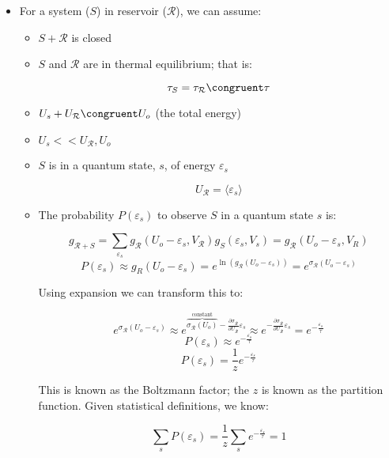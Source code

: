 \begin{itemize}

  \item For a system ($S$) in reservoir ($\mathcal{R}$), we can assume:

    \begin{itemize}

      \item $S+\mathcal{R}$ is closed

      \item $S$ and $\mathcal{R}$ are in thermal equilibrium; that is:

        $$\tau_S=\tau_{\mathcal{R}}\congruent \tau$$

      \item $U_s+U_{\mathcal{R}}\congruent U_o$ (the total energy)

      \item $U_s << U_{\mathcal{R}}, U_o$

      \item $S$ is in a quantum state, $s$, of energy $\varepsilon_s$

        $$U_{\mathcal{R}}=\langle \varepsilon_s\rangle$$

      \item The probability $P(\varepsilon_s)$ to observe $S$ in a quantum state $s$ is:

        $$g_{\mathcal{R}+S}=\sum_{\varepsilon_s}g_{\mathcal{R}}(U_o-\varepsilon_s,V_{\mathcal{R}})g_S(\varepsilon_s,V_s)=g_{\mathcal{R}}(U_o-\varepsilon_s,V_R)$$
        $$P(\varepsilon_s)\approx g_R(U_o-\varepsilon_s)=e^{\ln(g_{\mathcal{R}}(U_o-\varepsilon_s))}=e^{\sigma_{\mathcal{R}}(U_o-\varepsilon_s)}$$

        Using expansion we can transform this to:

        $$e^{\sigma_{\mathcal{R}}(U_o-\varepsilon_s)}\approx e^{\overbrace{\sigma_{\mathcal{R}}(U_o)}^{\text{constant}}-\frac{\partial \sigma_{\mathcal{R}}}{\partial U_{\mathcal{R}}}\varepsilon_s}\approx e^{-\frac{\partial \sigma_{\mathcal{R}}}{\partial U_{\mathcal{R}}}\varepsilon_s}=e^{-\frac{\varepsilon_s}{\tau}}$$
        $$\boxed{P(\varepsilon_s)\approx e^{-\frac{\varepsilon_s}{\tau}}}$$
        $$\boxed{P(\varepsilon_s)= \frac{1}{z}e^{-\frac{\varepsilon_s}{\tau}}}$$

        This is known as the Boltzmann factor; the $z$ is known as the partition function. Given statistical definitions, we know:

        $$\sum_s P(\varepsilon_s)=\frac{1}{z}\sum_s e^{-\frac{\varepsilon_s}{\tau}}=1$$


\end{itemize}
\end{itemize}
